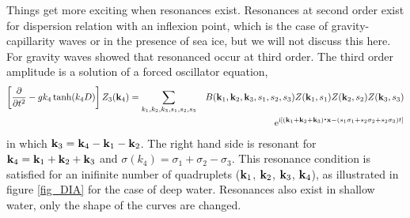 Things get more exciting when resonances exist. Resonances at second order exist for 
dispersion relation with an inflexion point, which is the case of gravity-capillarity waves or in the presence of sea ice, 
but we will not discuss this here. 
For gravity waves \cite{Phillips1960} showed that resonanced occur at third order. 
The third order amplitude is a solution of  a forced oscillator equation,
\begin{eqnarray}
\left[ \frac{\partial }{\partial t^2} - g k_4 \tanh(k_4 D) \right] Z_3(\mathbf{k}_4)   = \sum_{k_1,k_2,k_3,s_1,s_2,s_3} & &B(\mathbf{k}_1,\mathbf{k}_2,\mathbf{k}_3,s_1,s_2,s_3) Z(\mathbf{k}_1,s_1)  Z(\mathbf{k}_2,s_2)  
 Z(\mathbf{k}_3,s_3)  \nonumber \\
& &\mathrm{e}^{\mathrm{i} \left[(\mathbf{k}_1 + \mathbf{k}_2 + \mathbf{k}_3) \mbox{\boldmath $\cdot$} \mathbf{x} -(s_1 \sigma_1+s_2 \sigma_2 + s_2 \sigma_3) t\right]}
\end{eqnarray}
in which $\mathbf{k}_3=\mathbf{k}_4-\mathbf{k}_1-\mathbf{k}_2$. The right hand side is resonant for 
$\mathbf{k}_4=\mathbf{k}_1+\mathbf{k}_2+\mathbf{k}_3$ and $\sigma\left(k_4\right)=\sigma_1+\sigma_2-\sigma_3$. This resonance condition is satisfied for an inifinite 
number of quadruplets ($\mathbf{k}_1$, $\mathbf{k}_2$, $\mathbf{k}_3$, $\mathbf{k}_4$), as illustrated in figure \ref{fig_DIA} for the case of deep water. Resonances 
also exist in shallow water, only the shape of the curves are changed. 

